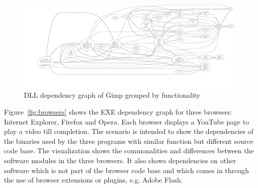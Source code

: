 \begin{figure}
\includegraphics[width=1.0\textwidth]{depvis/gimp-function-removed.pdf}
\caption{DLL dependency graph of Gimp grouped by functionality}
\label{fig:gimp-function}
\end{figure}

Figure~\ref{fig:browsers} shows the EXE dependency graph for three
brow\-sers: Internet Explorer, Firefox and Opera.
Each browser displays a YouTube page to play a
video till completion. The scenario is intended to show the dependencies
of the binaries used by the three programs
with similar function but different source code base.
The visualization shows the commonalities and differences
between the software modules in the three browsers.
It also shows dependencies on other software which is not part of
the browser code base and
which comes in through the use of browser extensions or plugins,
e.g. Adobe Flash.

